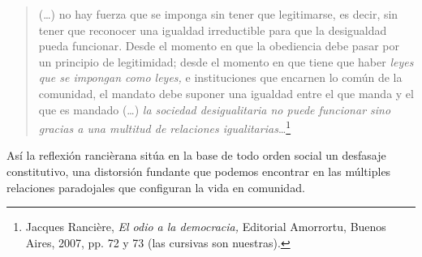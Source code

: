 \begin{quote}
(\dots) no hay fuerza que se imponga sin tener que legitimarse, es decir, sin tener que reconocer una igualdad irreductible para que la desigualdad pueda funcionar. Desde el momento en que la obediencia debe pasar por un principio de legitimidad; desde el momento en que tiene que haber \emph{leyes que se impongan como leyes,} e instituciones que encarnen lo común de la comunidad, el mandato debe suponer una igualdad entre el que manda y el que es mandado (\dots) \emph{la sociedad desigualitaria no puede funcionar sino gracias a una multitud de relaciones igualitarias}\ldots{}\footnote{Jacques Rancière, \emph{El odio a la democracia,} Editorial Amorrortu, Buenos Aires, 2007, pp. 72 y 73 (las cursivas son nuestras).}
\end{quote}

Así la reflexión rancièrana sitúa en la base de todo orden social un desfasaje constitutivo, una distorsión fundante que podemos encontrar en las múltiples relaciones paradojales que configuran la vida en comunidad.

